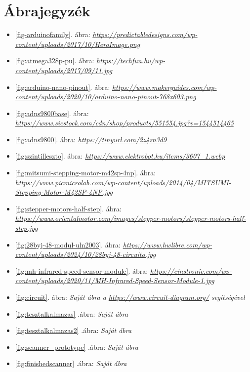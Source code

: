 \documentclass[]{thesis-ekf}
\theoremstyle{definition}
\theoremstyle{remark}
\begin{document}
	\chapter*{Ábrajegyzék}
	\begin{itemize}
		\item \ref{fig-arduinofamily}. ábra: \emph{\url{https://predictabledesigns.com/wp-content/uploads/2017/10/HeroImage.png}}
		\item \ref{fig:atmega328p-pu}. ábra: \emph{\url{https://techfun.hu/wp-content/uploads/2017/09/11.jpg}}
		\item \ref{fig:arduino-nano-pinout}. ábra: \emph{\url{https://www.makerguides.com/wp-content/uploads/2020/10/arduino-nano-pinout-768x603.png}}
		\item \ref{fig:adns9800base}. ábra: \emph{\url{https://www.sicstock.com/cdn/shop/products/551554.jpg?v=1544514465}}
		\item \ref{fig:adns9800}. ábra: \emph{\url{https://tinyurl.com/2z4zn3d9}} 
		\item \ref{fig:szintilleszto}. ábra: \emph{\url{https://www.elektrobot.hu/items/3607_1.webp}}
		\item \ref{fig:mitsumi-stepping-motor-m42sp-4np}. ábra: \emph{\url{https://www.picmicrolab.com/wp-content/uploads/2014/04/MITSUMI-Stepping-Motor-M42SP-4NP.jpg}}
		\item \ref{fig:stepper-motors-half-step}. ábra: \emph{\url{https://www.orientalmotor.com/images/stepper-motors/stepper-motors-half-step.jpg}}
		\item \ref{fig:28byj-48-modul-uln2003}. ábra: \emph{\url{https://www.hwlibre.com/wp-content/uploads/2024/10/28byj-48-circuito.jpg}}
		\item \ref{fig:mh-infrared-speed-sensor-module}. ábra: \emph{\url{https://einstronic.com/wp-content/uploads/2020/11/MH-Infrared-Speed-Sensor-Module-1.jpg}}
		\item \ref{fig:circuit}. ábra: \emph{Saját ábra a \url{https://www.circuit-diagram.org/} segítségével}
		\item \ref{fig:tesztalkalmazas} .ábra: \emph{Saját ábra}
		\item \ref{fig:tesztalkalmazas2} .ábra: \emph{Saját ábra}
		\item \ref{fig:scanner_prototype} .ábra: \emph{Saját ábra}
		\item \ref{fig:finishedscanner} .ábra: \emph{Saját ábra}
	\end{itemize}
\end{document}
